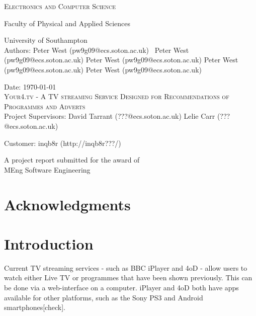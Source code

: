 \documentclass[12pt,a4paper,twoside, titlepage, openright, cleardoublepage=empty]{article}
\begin{document}


\begin{titlepage}

\begin{center}

\textsc{\large{Electronics and Computer Science}}

\large{Faculty of Physical and Applied Sciences}

\large{University of Southampton}\\[3.5cm]

\large{Authors: Peter West (pw9g09@ecs.soton.ac.uk) \
		Peter West (pw9g09@ecs.soton.ac.uk)
		Peter West (pw9g09@ecs.soton.ac.uk)
		Peter West (pw9g09@ecs.soton.ac.uk)
		Peter West (pw9g09@ecs.soton.ac.uk)}

\large{Date: \today}\\[4.0cm]

\textsc{\LARGE Your4.tv - A TV streaming Service Designed for Recommendations of Programmes and Adverts}\\[4.5cm]

\large{Project Supervisors: David Tarrant (???@ecs.soton.ac.uk)
		Lelie Carr (???@ecs.soton.ac.uk)}

\large{Customer: inqb8r (http://inqb8r???/)}

\vfill

\large{A project report submitted for the award of}\\[0.0cm]

\large{MEng Software Engineering}

\end{center}

\end{titlepage}


\cleardoublepage

\abstract{}

\cleardoublepage

\section{Acknowledgments}

\cleardoublepage
\setcounter{tocdepth}{2}
\tableofcontents
\newpage
\cleardoublepage
\setcounter{page}{0}
\cleardoublepage

\section{Introduction}
Current TV streaming services - such as BBC iPlayer and 4oD - allow users to watch either Live TV or programmes that have been shown previously. This can be done via a web-interface on a computer. iPlayer and 4oD both have apps available for other platforms, such as the Sony PS3 and Android smartphones[check].
\end{document}

